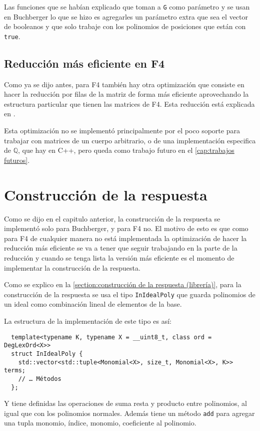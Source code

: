 \documentclass[12pt]{report}
\theoremstyle{customstyle}
\theoremstyle{factstyle}
\begin{document}
Las funciones que se habían explicado que toman a \texttt{G} como parámetro y se usan en Buchberger lo que se hizo es agregarles un parámetro extra que sea el vector de booleanos y que solo trabaje con los polinomios de posiciones que están con \texttt{true}.

\subsection{Reducción más eficiente en F4}

Como ya se dijo antes, para F4 también hay otra optimización que consiste en hacer la reducción por filas de la matriz de forma más eficiente aprovechando la estructura particular que tienen las matrices de F4. Esta reducción está explicada en \cite{thesis:Hof20}.

Esta optimización no se implementó principalmente por el poco soporte para trabajar con matrices de un cuerpo arbitrario, o de una implementación especifica de $ℚ$, que hay en C++, pero queda como trabajo futuro en el \cref{cap:trabajos futuros}.

\section{Construcción de la respuesta}

Como se dijo en el capitulo anterior, la construcción de la respuesta se implementó solo para Buchberger, y para F4 no. El motivo de esto es que como para F4 de cualquier manera no está implementada la optimización de hacer la reducción más eficiente se va a tener que seguir trabajando en la parte de la reducción y cuando se tenga lista la versión más eficiente es el momento de implementar la construcción de la respuesta.

Como se explico en la \cref{section:construcción de la respuesta (librería)}, para la construcción de la respuesta se usa el tipo \texttt{InIdealPoly} que guarda polinomios de un ideal como combinación lineal de elementos de la base.

La estructura de la implementación de este tipo es así:

\begin{verbatim}
  template<typename K, typename X = __uint8_t, class ord = DegLexOrd<X>>
  struct InIdealPoly {
    std::vector<std::tuple<Monomial<X>, size_t, Monomial<X>, K>> terms;
    // … Métodos
  };
\end{verbatim}

Y tiene definidas las operaciones de suma resta y producto entre polinomios, al igual que con los polinomios normales. Además tiene un método \texttt{add} para agregar una tupla monomio, índice, monomio, coeficiente al polinomio.
\end{document}
